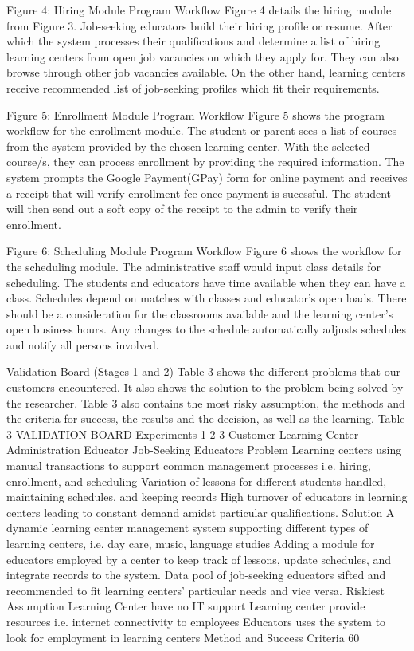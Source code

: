 Figure 4: Hiring Module Program Workflow
Figure 4 details the hiring module from Figure 3. Job-seeking educators build their hiring profile or resume. After which the system processes their qualifications and determine a list of hiring learning centers from open job vacancies on which they apply for. They can also browse through other job vacancies available. On the other hand, learning centers receive recommended list of job-seeking profiles which fit their requirements.   
 
Figure 5: Enrollment Module Program Workflow
Figure 5 shows the program workflow for the enrollment module. The student or parent sees a list of courses from the system provided by the chosen learning center. With the selected course/s, they can process enrollment by providing the required information. The system prompts the Google Payment(GPay) form for online payment and receives a receipt that will verify enrollment fee once payment is sucessful. The student will then send out a soft copy of the receipt to the admin to verify their enrollment. 
 
Figure 6: Scheduling Module Program Workflow
Figure 6 shows the workflow for the scheduling module. The administrative staff would input class details for scheduling. The students and educators have time available when they can have a class. Schedules depend on matches with classes and educator’s open loads. There should be a consideration for the classrooms available and the learning center’s open business hours. Any changes to the schedule automatically adjusts schedules and notify all persons involved. 

Validation Board (Stages 1 and 2)
Table 3 shows the different problems that our customers encountered. It also shows the solution to the problem being solved by the researcher. Table 3 also contains the most risky assumption, the methods and the criteria for success, the results and the decision, as well as the learning. 	
Table 3
VALIDATION BOARD 
Experiments	1	2	3
Customer	Learning Center Administration	Educator	Job-Seeking Educators
Problem	Learning centers using manual transactions to support common management processes i.e. hiring, enrollment, and scheduling	Variation of lessons for different students handled, maintaining schedules, and keeping records	High turnover of educators in learning centers leading to constant demand amidst particular qualifications.
Solution	A dynamic learning center management system supporting different types of learning centers, i.e. day care, music, language studies	Adding a module for educators employed by a center to keep track of lessons, update schedules, and integrate records to the system.	Data pool of job-seeking educators sifted and recommended to fit learning centers' particular needs and vice versa.
Riskiest Assumption	Learning Center have no IT support	Learning center provide resources i.e. internet connectivity to employees	Educators uses the system to look for employment in learning centers
Method and Success Criteria	60%


